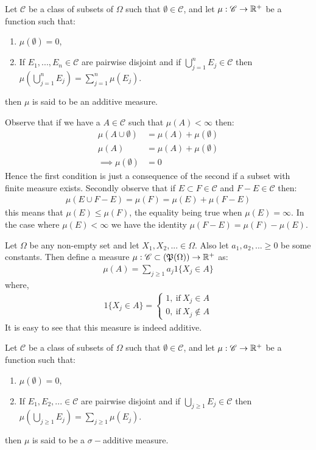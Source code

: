 \begin{definition}
  Let $ \mathscr{C}$ be a class of subsets of $\Omega$ such that $\emptyset \in \mathscr{C}$, and let $\mu: \mathscr{C}\to\mathbb{R}^+$ be a function such that:
  \begin{enumerate}
    \item $\mu(\emptyset) = 0$,
    \item If $E_1,...,E_n \in \mathscr{C}$ are pairwise disjoint and if $\bigcup_{j=1}^nE_j \in \mathscr{C}$ then $\mu(\bigcup_{j=1}^nE_j)=\sum_{j=1}^n\mu(E_j)$.
  \end{enumerate}
  then $\mu$ is said to be an additive measure.
\end{definition}
\begin{remark}
Observe that if we have a $A\in \mathscr{C}$ such that $\mu(A)<\infty$ then:
\begin{align*}
  \mu(A\cup \emptyset) &= \mu(A) + \mu(\emptyset)\\
  \mu(A) &= \mu(A) + \mu(\emptyset)\\
  \implies \mu(\emptyset) &= 0
\end{align*}
Hence the first condition is just a consequence of the second if a subset with finite measure exists. Secondly observe that if $E\subset F \in \mathscr{C}$ and $F-E\in \mathscr{C}$ then:
\begin{align*}
  \mu(E\cup F-E) = \mu(F) = \mu(E) + \mu(F-E)
\end{align*}
this means that $\mu(E)\leq \mu(F)$, the equality being true when $\mu(E) = \infty$. In the case where $\mu(E)<\infty$ we have the identity $\mu(F-E) = \mu(F)-\mu(E)$.
\end{remark}
\begin{example}
  Let $\Omega$ be any non-empty set and let $X_1,X_2,...\in \Omega$. Also let $a_1, a_2,...\geq0$ be some constants. Then define a measure $\mu: \mathscr{C}\subset (\mathfrak{P}(\Omega))\to \mathbb{R}^+$ as:
  \begin{align*}
    \mu(A) = \sum_{j\geq 1} a_j 1\{X_j\in A\}
  \end{align*}
  where,
  \begin{align*}
    1\{X_j\in A\} = \begin{cases}
      1,\ \text{if}\ X_j\in A\\
      0,\ \text{if}\ X_j\notin A
    \end{cases}
  \end{align*}
  It is easy to see that this measure is indeed additive. 
\end{example}
\begin{definition}
  Let $ \mathscr{C}$ be a class of subsets of $\Omega$ such that $\emptyset \in \mathscr{C}$, and let $\mu: \mathscr{C}\to\mathbb{R}^+$ be a function such that:
  \begin{enumerate}
    \item $\mu(\emptyset) = 0$,
    \item If $E_1,E_2,... \in \mathscr{C}$ are pairwise disjoint and if $\bigcup_{j\geq1}E_j \in \mathscr{C}$ then $\mu(\bigcup_{j\geq1}E_j)=\sum_{j\geq1}\mu(E_j)$.
  \end{enumerate}
  then $\mu$ is said to be a $\sigma-$additive measure.
\end{definition}
